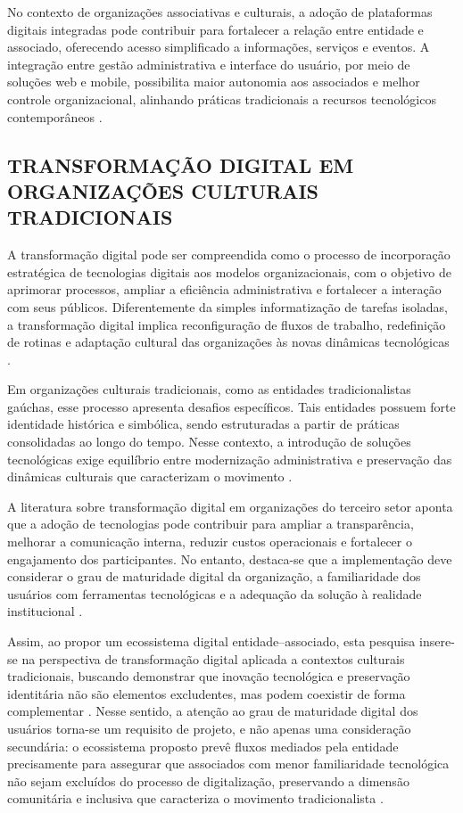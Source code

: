 ﻿\documentclass[12pt,a4paper]{article}
\begin{document}
No contexto de organizações associativas e culturais, a adoção de plataformas digitais integradas pode contribuir para fortalecer a relação entre entidade e associado, oferecendo acesso simplificado a informações, serviços e eventos. A integração entre gestão administrativa e interface do usuário, por meio de soluções web e mobile, possibilita maior autonomia aos associados e melhor controle organizacional, alinhando práticas tradicionais a recursos tecnológicos contemporâneos \citep{jacobides2018,verhoef2021}.

\subsection{TRANSFORMAÇÃO DIGITAL EM ORGANIZAÇÕES CULTURAIS TRADICIONAIS}

A transformação digital pode ser compreendida como o processo de incorporação estratégica de tecnologias digitais aos modelos organizacionais, com o objetivo de aprimorar processos, ampliar a eficiência administrativa e fortalecer a interação com seus públicos. Diferentemente da simples informatização de tarefas isoladas, a transformação digital implica reconfiguração de fluxos de trabalho, redefinição de rotinas e adaptação cultural das organizações às novas dinâmicas tecnológicas \citep{vial2019,verhoef2021}.

Em organizações culturais tradicionais, como as entidades tradicionalistas gaúchas, esse processo apresenta desafios específicos. Tais entidades possuem forte identidade histórica e simbólica, sendo estruturadas a partir de práticas consolidadas ao longo do tempo. Nesse contexto, a introdução de soluções tecnológicas exige equilíbrio entre modernização administrativa e preservação das dinâmicas culturais que caracterizam o movimento \citep{hinings2018,warnerwager2019}.

A literatura sobre transformação digital em organizações do terceiro setor aponta que a adoção de tecnologias pode contribuir para ampliar a transparência, melhorar a comunicação interna, reduzir custos operacionais e fortalecer o engajamento dos participantes. No entanto, destaca-se que a implementação deve considerar o grau de maturidade digital da organização, a familiaridade dos usuários com ferramentas tecnológicas e a adequação da solução à realidade institucional \citep{vial2019,hinings2018,verhoef2021}.

Assim, ao propor um ecossistema digital entidade--associado, esta pesquisa insere-se na perspectiva de transformação digital aplicada a contextos culturais tradicionais, buscando demonstrar que inovação tecnológica e preservação identitária não são elementos excludentes, mas podem coexistir de forma complementar \citep{hinings2018,warnerwager2019}. Nesse sentido, a atenção ao grau de maturidade digital dos usuários torna-se um requisito de projeto, e não apenas uma consideração secundária: o ecossistema proposto prevê fluxos mediados pela entidade precisamente para assegurar que associados com menor familiaridade tecnológica não sejam excluídos do processo de digitalização, preservando a dimensão comunitária e inclusiva que caracteriza o movimento tradicionalista \citep{vial2019,hinings2018}.
\end{document}
